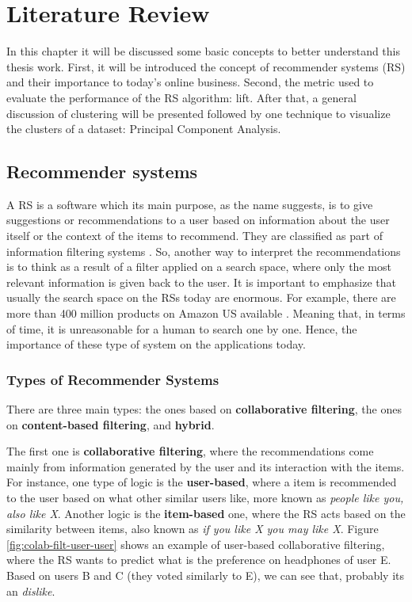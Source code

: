\newcommand{\ASKA}{$\text{ASK}^0$}
\newcommand{\ASKS}{$\text{ASK}^*$}

\chapter{Literature Review}

In this chapter it will be discussed some basic concepts to better understand this thesis work. First, it will be introduced the concept of  recommender systems (RS) and their importance to today's online business. Second, the metric used to evaluate the performance of the RS algorithm: lift. After that, a general discussion of clustering will be presented followed by one technique to visualize the clusters of a dataset: Principal Component Analysis.


\section{Recommender systems}

A RS is a software which its main purpose, as the name suggests, is to give suggestions \cite{ricci2011introduction} or recommendations to a user based on information about the user itself or the context of the items to recommend. They are classified as part of information filtering systems \cite{RecommendersystemWikipedia}. So, another way to interpret the recommendations is to think as a result of a filter applied on a search space, where only the most relevant information is given back to the user. It is important to emphasize that usually the search space on the RSs today are enormous. For example, there are more than 400 million products on Amazon US available \cite{amazon-number-of-products-2015}. Meaning that, in terms of time, it is unreasonable for a human to search one by one. Hence, the importance of these type of system on the applications today.

\subsection{Types of Recommender Systems}

There are three main types: the ones based on \textbf{collaborative filtering}, the ones on \textbf{content-based filtering}, and \textbf{hybrid}. 

The first one is \textbf{collaborative filtering}, where the recommendations come mainly from information generated by the user and its interaction with the items. For instance, one type of logic is the \textbf{user-based}, where a item is recommended to the user based on what other similar users like, more known as \textit{people like you, also like X}. Another logic is the \textbf{item-based} one, where the RS acts based on the similarity between items, also known as \textit{if you like X you may like X}. Figure \ref{fig:colab-filt-user-user} shows an example of user-based collaborative filtering, where the RS wants to predict what is the preference on headphones of user E. Based on users B and C (they voted similarly to E), we can see that, probably its an \textit{dislike}.

